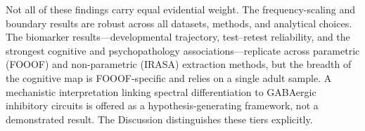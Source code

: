 Not all of these findings carry equal evidential weight. The frequency-scaling and boundary results are robust across all datasets, methods, and analytical choices. The biomarker results---developmental trajectory, test--retest reliability, and the strongest cognitive and psychopathology associations---replicate across parametric (FOOOF) and non-parametric (IRASA) extraction methods, but the breadth of the cognitive map is FOOOF-specific and relies on a single adult sample. A mechanistic interpretation linking spectral differentiation to GABAergic inhibitory circuits is offered as a hypothesis-generating framework, not a demonstrated result. The Discussion distinguishes these tiers explicitly.
